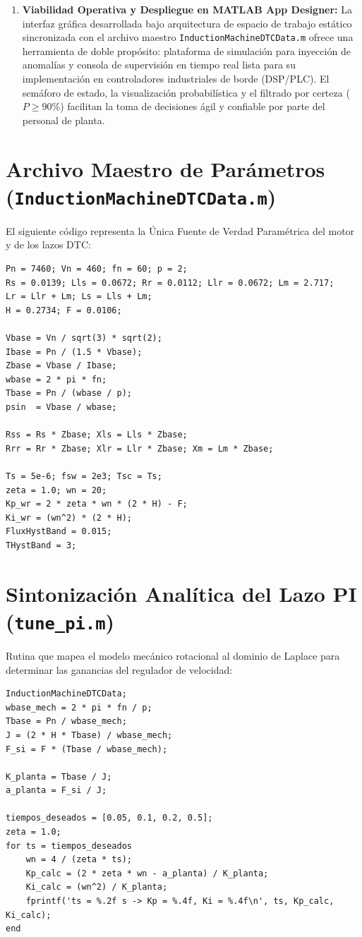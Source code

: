 \documentclass[conference]{IEEEtran}
\begin{document}
\begin{enumerate}
    \item \textbf{Viabilidad Operativa y Despliegue en MATLAB App Designer:} La interfaz gráfica desarrollada bajo arquitectura de espacio de trabajo estático sincronizada con el archivo maestro \texttt{InductionMachineDTCData.m} ofrece una herramienta de doble propósito: plataforma de simulación para inyección de anomalías y consola de supervisión en tiempo real lista para su implementación en controladores industriales de borde (DSP/PLC). El semáforo de estado, la visualización probabilística y el filtrado por certeza ($P \ge 90\%$) facilitan la toma de decisiones ágil y confiable por parte del personal de planta.
\end{enumerate}

\newpage
\appendices

\section{Archivo Maestro de Parámetros (\texttt{InductionMachineDTCData.m})}
\label{app:dtcdata}
El siguiente código representa la Única Fuente de Verdad Paramétrica del motor y de los lazos DTC:
\begin{lstlisting}[caption={Script maestro de constantes paramétricas (\texttt{InductionMachineDTCData.m})}, label={lst:dtcdata}]
Pn = 7460; Vn = 460; fn = 60; p = 2;
Rs = 0.0139; Lls = 0.0672; Rr = 0.0112; Llr = 0.0672; Lm = 2.717;
Lr = Llr + Lm; Ls = Lls + Lm;
H = 0.2734; F = 0.0106;

Vbase = Vn / sqrt(3) * sqrt(2);
Ibase = Pn / (1.5 * Vbase);
Zbase = Vbase / Ibase;
wbase = 2 * pi * fn;
Tbase = Pn / (wbase / p);
psin  = Vbase / wbase;

Rss = Rs * Zbase; Xls = Lls * Zbase;
Rrr = Rr * Zbase; Xlr = Llr * Zbase; Xm = Lm * Zbase;

Ts = 5e-6; fsw = 2e3; Tsc = Ts;
zeta = 1.0; wn = 20;
Kp_wr = 2 * zeta * wn * (2 * H) - F;
Ki_wr = (wn^2) * (2 * H);
FluxHystBand = 0.015;
THystBand = 3;
\end{lstlisting}

\newpage
\section{Sintonización Analítica del Lazo PI (\texttt{tune\_pi.m})}
\label{app:tunepi}
Rutina que mapea el modelo mecánico rotacional al dominio de Laplace para determinar las ganancias del regulador de velocidad:
\begin{lstlisting}[caption={Sintonización del regulador PI de velocidad (\texttt{tune\_pi.m})}, label={lst:tunepi}]
InductionMachineDTCData;
wbase_mech = 2 * pi * fn / p;
Tbase = Pn / wbase_mech;
J = (2 * H * Tbase) / wbase_mech;
F_si = F * (Tbase / wbase_mech);

K_planta = Tbase / J;
a_planta = F_si / J;

tiempos_deseados = [0.05, 0.1, 0.2, 0.5];
zeta = 1.0;
for ts = tiempos_deseados
    wn = 4 / (zeta * ts);
    Kp_calc = (2 * zeta * wn - a_planta) / K_planta;
    Ki_calc = (wn^2) / K_planta;
    fprintf('ts = %.2f s -> Kp = %.4f, Ki = %.4f\n', ts, Kp_calc, Ki_calc);
end
\end{lstlisting}
\end{document}

